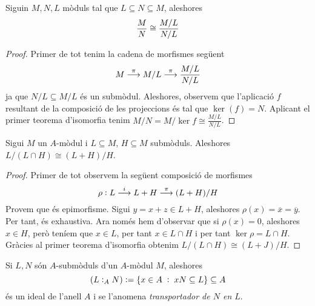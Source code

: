 \documentclass[../../../main.tex]{subfiles}
\begin{document}
\begin{ter}
\label{ter:tercerteoremaisomorfia} Siguin $M,N,L$ mòduls tal que $L\subseteq N\subseteq M$, aleshores
\begin{equation}
    \notag
    \frac{M}{N}\cong \frac{M/L}{N/L}
\end{equation}
\end{ter}
\begin{proof}
Primer de tot tenim la cadena de morfismes següent
\begin{equation}
    \notag
    M\overset{\pi}{\longrightarrow} M/L\overset{\pi}{\longrightarrow} \frac{M/L}{N/L}
\end{equation}
ja que $N/L\subseteq M/L$ és un submòdul. Aleshores, observem que l'aplicació $f$ resultant de la composició de les projeccions és tal que $\ker(f) = N$. Aplicant el primer teorema d'isomorfia tenim $M/N = M/\ker f\cong \frac{M/L}{N/L}$.
\end{proof}

\begin{ter}
\label{ter:segonTeoremaIsomorfia} Sigui $M$ un $A$-mòdul i $L\subseteq M$, $H\subseteq M$ submòduls. Aleshores $L/(L\cap H)\cong (L+H)/H$. 
\end{ter}
\begin{proof}
Primer de tot observem la següent composició de morfismes
\begin{equation}
    \notag
    \rho:L\overset{i}{\longrightarrow}L+H\overset{\pi}{\longrightarrow} (L+H)/H
\end{equation}
Provem que és epimorfisme. Sigui $y = x+z\in L+H$, aleshores $\rho(x) = \overline{x}=\overline{y}$. Per tant, és exhaustiva. Ara només hem d'observar que si $\rho(x) = 0$, aleshores $x\in H$, però teníem que $x\in L$, per tant $x\in L\cap H$ i per tant $\ker\rho = L\cap H$. Gràcies al primer teorema d'isomorfia obtenim $L/(L\cap H)\cong (L+J)/H$.
\end{proof}

\begin{defi}
[Transportador]\label{def:transportadormoduls} Si $L,N$ són $A$-submòduls d'un $A$-mòdul $M$, aleshores
\begin{equation}
    \notag
    (L:_AN) := \{x\in A\;:\;xN\subseteq L\}\subseteq A
\end{equation}
és un ideal de l'anell $A$ i se l'anomena \textit{transportador de $N$ en $L$}.
\end{defi}
\end{document}

